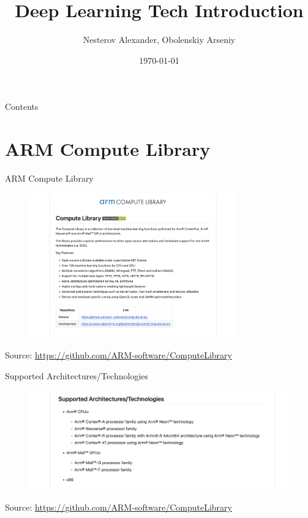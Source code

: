 \documentclass{beamer}
\title[Deep Learning Tech Introduction]{Deep Learning Tech Introduction}
\author{Nesterov Alexander, Obolenskiy Arseniy}
\institute{ITLab}
\date{\today}
\begin{document}
\begin{frame}
    \titlepage
\end{frame}

\begin{frame}{Contents}
    \tableofcontents
\end{frame}

\section{ARM Compute Library}
\begin{frame}{ARM Compute Library}
  \begin{figure}[h]
    \includegraphics[width=0.8\textwidth]{images/acl.png}
  \end{figure}
  \footnotesize Source: \href{https://github.com/ARM-software/ComputeLibrary}{https://github.com/ARM-software/ComputeLibrary}
\end{frame}

\begin{frame}{Supported Architectures/Technologies}
  \begin{figure}[h]
    \includegraphics[width=1\textwidth]{images/arch.png}
  \end{figure}
  \footnotesize Source: \href{https://github.com/ARM-software/ComputeLibrary}{https://github.com/ARM-software/ComputeLibrary}
\end{frame}
\end{document}
